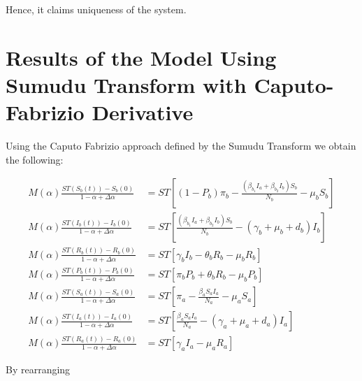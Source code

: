 \documentclass[10pt]{NSP1}
\begin{document}
Hence, it claims uniqueness of the system.

\section{Results of the Model Using Sumudu Transform with Caputo-Fabrizio Derivative}

Using the Caputo Fabrizio approach defined by the Sumudu Transform we obtain the following:

\small

\begin{equation}
\begin{aligned}
M(\alpha)\frac{ST\left( S_{b}(t) \right) - S_{b}(0)}{1 - \alpha + \Delta\alpha} &= ST\left\lbrack \left( 1 - P_{b} \right)\pi_{b} - \frac{\left( \beta_{b_{1}}I_{a} + \beta_{b_{2}}I_{b} \right)S_{b}}{N_{b}} - \mu_{b}S_{b} \right\rbrack \\
M(\alpha)\frac{ST\left( I_{b}(t) \right) - I_{b}(0)}{1 - \alpha + \Delta\alpha} &= ST\left\lbrack \frac{\left( \beta_{b_{1}}I_{a} + \beta_{b_{2}}I_{b} \right)S_{b}}{N_{b}} - \left( \gamma_{b} + \mu_{b} + d_{b} \right)I_{b} \right\rbrack \\
M(\alpha)\frac{ST\left( R_{b}(t) \right) - R_{b}(0)}{1 - \alpha + \Delta\alpha} &= ST\left\lbrack \gamma_{b}I_{b} - \theta_{b}R_{b} - \mu_{b}R_{b} \right\rbrack \\
M(\alpha)\frac{ST\left( P_{b}(t) \right) - P_{b}(0)}{1 - \alpha + \Delta\alpha} &= ST\left\lbrack \pi_{b}P_{b} + \theta_{b}R_{b} - \mu_{b}P_{b} \right\rbrack \\
M(\alpha)\frac{ST\left( S_{a}(t) \right) - S_{a}(0)}{1 - \alpha + \Delta\alpha} &= ST\left\lbrack \pi_{a} - \frac{\beta_{a}S_{a}I_{a}}{N_{a}} - \mu_{a}S_{a} \right\rbrack \\
M(\alpha)\frac{ST\left( I_{a}(t) \right) - I_{a}(0)}{1 - \alpha + \Delta\alpha} &= ST\left\lbrack \frac{\beta_{a}S_{a}I_{a}}{N_{a}} - \left( \gamma_{a} + \mu_{a} + d_{a} \right)I_{a} \right\rbrack \\
M(\alpha)\frac{ST\left( R_{a}(t) \right) - R_{a}(0)}{1 - \alpha + \Delta\alpha} &= ST\left\lbrack \gamma_{a}I_{a} - \mu_{a}R_{a} \right\rbrack
\end{aligned}
\end{equation}



By rearranging
\end{document}
